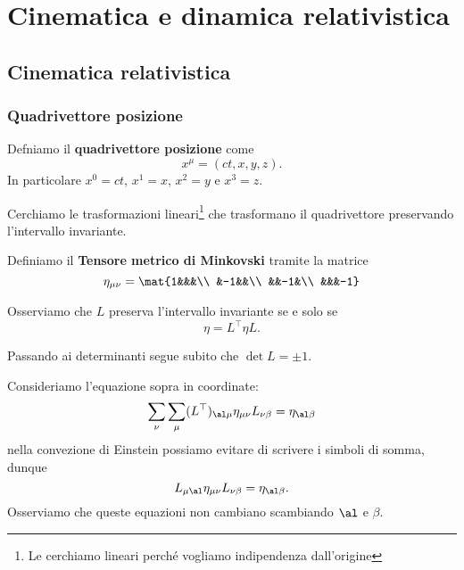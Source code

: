 \chapter{Cinematica e dinamica relativistica}
\section{Cinematica relativistica}
\subsection{Quadrivettore posizione}
\begin{definition}
Defniamo il \textbf{quadrivettore posizione} come
\[x^\mu=(ct,x,y,z).\]
In particolare $x^0=ct$, $x^1=x$, $x^2=y$ e $x^3=z$.
\end{definition}

Cerchiamo le trasformazioni lineari\footnote{Le cerchiamo lineari perch\'e vogliamo indipendenza dall'origine} che trasformano il quadrivettore preservando l'intervallo invariante.

\begin{definition}
Definiamo il \textbf{Tensore metrico di Minkovski} tramite la matrice
\[\eta_{\mu\nu}=\mat{1&&&\\
&-1&&\\
&&-1&\\
&&&-1}\]
\end{definition}
\noindent
Osserviamo che $L$ preserva l'intervallo invariante se e solo se
\[\eta=L^\top\eta L.\]
\begin{remark}
Passando ai determinanti segue subito che $\det L=\pm 1$.
\end{remark}


\noindent Consideriamo l'equazione sopra in coordinate:
\[\sum_\nu\sum_\mu(L^\top)_{\al\mu}\eta_{\mu\nu}L_{\nu\beta}=\eta_{\al\beta}\]
nella convezione di Einstein possiamo evitare di scrivere i simboli di somma, dunque
\[L_{\mu\al}\eta_{\mu\nu}L_{\nu\beta}=\eta_{\al\beta}.\]
Osserviamo che queste equazioni non cambiano scambiando $\al$ e $\beta$.

